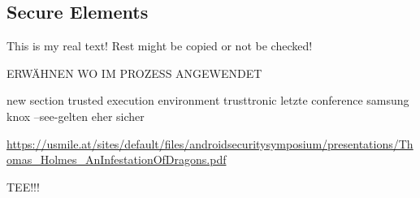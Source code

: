 \subsection{Secure Elements}\label{subsection:external-secure}
This is my real text! Rest might be copied or not be checked!


ERWÄHNEN WO IM PROZESS ANGEWENDET\newline

new section trusted execution environment
trusttronic letzte conference
samsung knox
--see-gelten eher sicher

\url{https://usmile.at/sites/default/files/androidsecuritysymposium/presentations/Thomas_Holmes_AnInfestationOfDragons.pdf}


TEE!!!
